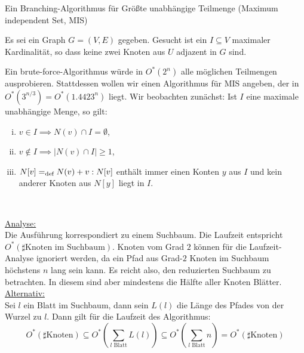 \begin{section}{Ein Branching-Algorithmus für Größte unabhängige Teilmenge (Maximum independent Set, MIS)}

  Es sei ein Graph \(G = (V,E)\) gegeben. Gesucht ist ein \(I \subseteq V\) maximaler Kardinalität, so dass keine zwei Knoten aus \(U\) adjazent in \(G\) sind.

  Ein brute-force-Algorithmus würde in \(O^*(2^n)\) alle möglichen Teilmengen ausprobieren. Stattdessen wollen wir einen Algorithmus für MIS angeben, der in \(O^*(3^{n/3}) = O^*(1.4423^n)\) liegt. Wir beobachten zunächst: Ist \(I\) eine maximale unabhängige Menge, so gilt:

  \begin{enumerate}[(i)]
   \item \(v \in I \implies N(v) \cap I = \emptyset\),
   \item \(v \notin I \implies |N(v) \cap I| \geq 1\),
   \item $N[v] =_\text{def} N(v) + v: N[v]$ enthält immer einen Konten $y$ aus $I$ und kein anderer Knoten aus $N[y]$ liegt in $I$.
  \end{enumerate}

  \begin{algorithm}[H]
    \caption{Algorithmus zur Berechnung der Mächtigkeit einer größten unabhängigen Menge}

     \\

  \end{algorithm}
  
  \underline{Analyse:}\\
  Die Ausführung korrespondiert zu einem Suchbaum. Die Laufzeit entspricht $O^*(\sharp\text{Knoten im Suchbaum})$. Knoten vom Grad $2$ können für die Laufzeit-Analyse ignoriert werden, da ein Pfad aus Grad-$2$ Knoten im Suchbaum höchstens $n$ lang sein kann. Es reicht also, den reduzierten Suchbaum zu betrachten. In diesem sind aber mindestens die Hälfte aller Knoten Blätter.\\
  \underline{Alternativ:}\\
  Sei $l$ ein Blatt im Suchbaum, dann sein $L(l)$ die Länge des Pfades von der Wurzel zu $l$. Dann gilt für die Laufzeit des Algorithmus:
  \[ O^*(\sharp\text{Knoten}) \subseteq O^*(\sum_{l \text{ Blatt}} L(l)) \subseteq O^*(\sum_{l \text{ Blatt}} n) = O^*(\sharp\text{Knoten})\]
  

\end{section}
